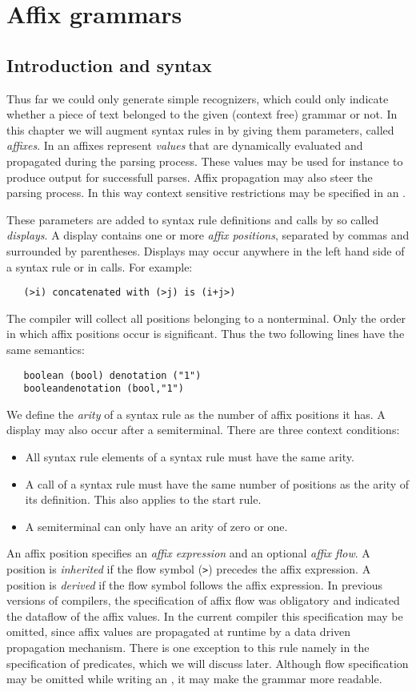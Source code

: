 \chapter {Affix grammars}
\section {Introduction and syntax}
Thus far we could only generate simple recognizers, which could
only indicate whether a piece of text belonged to the given (context free)
grammar or not. In this chapter we will augment syntax rules
in \EAG by giving them parameters, called {\em affixes}. In an \EAG
affixes represent {\em values} that are dynamically evaluated and propagated
during the parsing process. These values may be used for instance
to produce output for successfull parses. Affix propagation 
may also steer the parsing process. In this way context sensitive
restrictions may be specified in an \EAGns.

These parameters are added to syntax rule definitions and calls
by so called {\em displays}. A display contains one or more
{\em affix positions}, separated by commas and surrounded by
parentheses. Displays may occur anywhere in the left
hand side of a syntax rule or in calls. For example:
\begin{verbatim}
   (>i) concatenated with (>j) is (i+j>)
\end{verbatim}
The \EAG compiler will collect all positions belonging to a
nonterminal. Only the order in which affix positions occur
is significant. Thus the two following lines have the same semantics:
\begin{verbatim}
   boolean (bool) denotation ("1")
   booleandenotation (bool,"1")
\end{verbatim}

We define the {\em arity} of a syntax rule as the number of affix
positions it has. A display may also occur after a semiterminal.
There are three context conditions:
\begin {itemize}
\item
All syntax rule elements of a syntax rule must have the same arity.
\item
A call of a syntax rule must have the same number of positions as
the arity of its definition. This also applies to the start rule.
\item
A semiterminal can only have an arity of zero or one.
\end {itemize}

An affix position specifies an {\em affix expression} and an optional
{\em affix flow}. A position is {\em inherited} if the flow symbol (\verb+>+)
precedes the affix expression. A position is {\em derived} if
the flow symbol follows the affix expression. In previous
versions of \EAG compilers, the specification of affix flow
was obligatory and indicated the dataflow of the affix values.
In the current \EAG compiler this specification
may be omitted, since affix values are propagated at runtime
by a data driven propagation mechanism. There is one exception to
this rule namely in the specification of predicates, which we will
discuss later. Although flow specification may be omitted 
while writing an \EAGns, it may make the grammar more readable.

